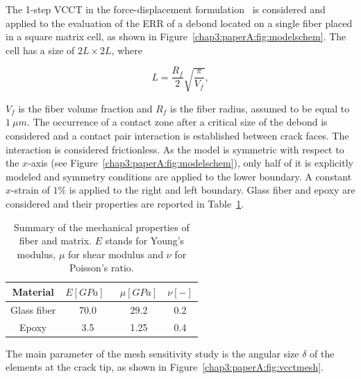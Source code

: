 The 1-step VCCT in the force-displacement formulation~\cite{Krueger2004} is considered and applied to the evaluation of the ERR of a debond located on a single fiber placed in a square matrix cell, as shown in Figure~\ref{chap3:paperA:fig:modelschem}. The cell has a size of $2L\times2L$, where

\begin{equation}\label{chap3:paperA:eq:LVf}
L=\frac{R_{f}}{2}\sqrt{\frac{\pi}{V_{f}}},
\end{equation}

$V_{f}$ is the fiber volume fraction and $R_{f}$ is the fiber radius, assumed to be equal to $1\ \mu m$. The occurrence of a contact zone after a critical size of the debond is considered and a contact pair interaction is established between crack faces. The interaction is considered frictionless. As the model is symmetric with respect to the $x$-axis (see Figure~\ref{chap3:paperA:fig:modelschem}), only half of it is explicitly modeled and symmetry conditions are applied to the lower boundary. A constant $x$-strain of $1\%$ is applied to the right and left boundary. Glass fiber and epoxy are considered and their properties are reported in Table~\ref{chap3:paperA:tab:phaseprop}.

\begin{table}[!htbp]
 \centering
 \caption{Summary of the mechanical properties of fiber and matrix. $E$ stands for Young's modulus, $\mu$ for shear modulus and $\nu$ for Poisson's ratio.}
 \begin{tabular}{cccc}
\textbf{Material} & \textbf{$E\left[GPa\right]$}\ & \textbf{$\mu\left[GPa\right]$} & \textbf{$\nu\left[-\right]$} \\
\midrule
Glass fiber    & 70.0  & 29.2   & 0.2  \\
Epoxy    & 3.5    & 1.25   & 0.4
\end{tabular}
\label{chap3:paperA:tab:phaseprop}
\end{table}

The main parameter of the mesh sensitivity study is the angular size $\delta$ of the elements at the crack tip, as shown in Figure~\ref{chap3:paperA:fig:vcctmesh}.

